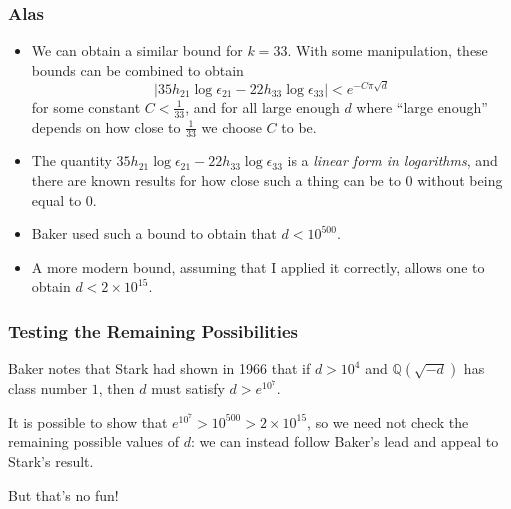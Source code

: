 \documentclass{beamer}
\begin{document}
\begin{frame}

	\frametitle{Alas}

	\begin{itemize}

		\item We can obtain a similar bound for $k = 33$. With some manipulation, these bounds can be combined to obtain
			\[
				\left| 35 h_{21} \log \epsilon_{21} - 22 h_{33} \log \epsilon_{33} \right| < e^{-C \pi \sqrt{d}}
			\]
			for some constant $C < \frac{1}{33}$, and for all large enough $d$ where ``large enough'' depends on how close to $\frac{1}{33}$ we choose $C$ to be.
			\pause

		\item The quantity $35 h_{21} \log \epsilon_{21} - 22 h_{33} \log \epsilon_{33}$ is a \emph{linear form in logarithms}, and there are known results for how close such a thing can be to $0$ without being equal to $0$. \pause

		\item Baker used such a bound to obtain that $d < 10^{500}$. \pause

		\item A more modern bound, assuming that I applied it correctly, allows one to obtain $d < 2 \times 10^{15}$.

	\end{itemize}

\end{frame}

\begin{frame}

	\frametitle{Testing the Remaining Possibilities}

	Baker notes that Stark had shown in 1966 that if $d > 10^4$ and $\mathbb{Q}(\sqrt{-d})$ has class number $1$, then $d$ must satisfy $d > e^{10^7}$. \pause

	It is possible to show that $e^{10^7} > 10^{500} > 2 \times 10^{15}$, so we need not check the remaining possible values of $d$: we can instead follow Baker's lead and appeal to Stark's result. \pause

	But that's no fun!

\end{frame}
\end{document}
